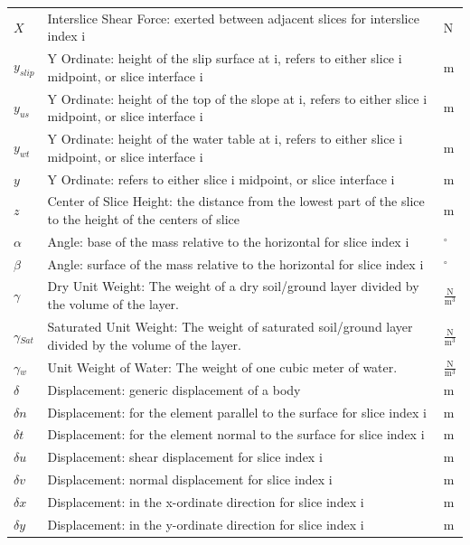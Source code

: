 \documentclass[12pt]{article}
\begin{document}
\begin{longtabu}{l X[l] l}
\\
$X$ & Interslice Shear Force: exerted between adjacent slices for interslice index i & N
\\
${y_{slip}}$ & Y Ordinate: height of the slip surface at i, refers to either slice i midpoint, or slice interface i & m
\\
${y_{us}}$ & Y Ordinate: height of the top of the slope at i, refers to either slice i midpoint, or slice interface i & m
\\
${y_{wt}}$ & Y Ordinate: height of the water table at i, refers to either slice i midpoint, or slice interface i & m
\\
$y$ & Y Ordinate: refers to either slice i midpoint, or slice interface i & m
\\
$z$ & Center of Slice Height: the distance from the lowest part of the slice to the height of the centers of slice & m
\\
$\alpha{}$ & Angle: base of the mass relative to the horizontal for slice index i & ${}^{\circ}$
\\
$\beta{}$ & Angle: surface of the mass relative to the horizontal for slice index i & ${}^{\circ}$
\\
$\gamma{}$ & Dry Unit Weight: The weight of a dry soil/ground layer divided by the volume of the layer. & $\frac{\text{N}}{\text{m}^{3}}$
\\
${\gamma{}_{Sat}}$ & Saturated Unit Weight: The weight of saturated soil/ground layer divided by the volume of the layer. & $\frac{\text{N}}{\text{m}^{3}}$
\\
${\gamma{}_{w}}$ & Unit Weight of Water: The weight of one cubic meter of water. & $\frac{\text{N}}{\text{m}^{3}}$
\\
$\delta{}$ & Displacement: generic displacement of a body & m
\\
$\delta{}n$ & Displacement: for the element parallel to the surface for slice index i & m
\\
$\delta{}t$ & Displacement: for the element normal to the surface for slice index i & m
\\
$\delta{}u$ & Displacement: shear displacement for slice index i & m
\\
$\delta{}v$ & Displacement: normal displacement for slice index i & m
\\
$\delta{}x$ & Displacement: in the x-ordinate direction for slice index i & m
\\
$\delta{}y$ & Displacement: in the y-ordinate direction for slice index i & m
\\

\end{longtabu}
\end{document}

